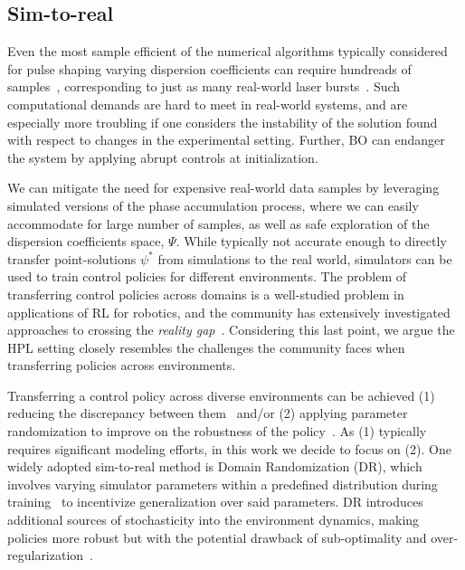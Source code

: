 \subsection{Sim-to-real}
Even the most sample efficient of the numerical algorithms typically considered for pulse shaping varying dispersion coefficients can require hundreads of samples~\citep{capuano2022laser}, corresponding to just as many real-world laser bursts~\citep{shalloo2020automation}. Such computational demands are hard to meet in real-world systems, and are especially more troubling if one considers the instability of the solution found with respect to changes in the experimental setting. Further, BO can endanger the system by applying abrupt controls at initialization.

We can mitigate the need for expensive real-world data samples by leveraging simulated versions of the phase accumulation process, where we can easily accommodate for large number of samples, as well as safe exploration of the dispersion coefficients space, \( \Psi \). While typically not accurate enough to directly transfer point-solutions \( \psi^* \) from simulations to the real world, simulators can be used to train control policies for different environments. The problem of transferring control policies across domains is a well-studied problem in applications of RL for robotics, and the community has extensively investigated approaches to crossing the \emph{reality gap}~\citep{tobin2017domain, valassakis2020crossing}. Considering this last point, we argue the HPL setting closely resembles the challenges the community faces when transferring policies across environments. 

Transferring a control policy across diverse environments can be achieved (1) reducing the discrepancy between them~\citep{zhu2017fast} and/or (2) applying parameter randomization to improve on the robustness of the policy~\citep{peng2018sim}.
As (1) typically requires significant modeling efforts, in this work we decide to focus on (2).
One widely adopted sim-to-real method is Domain Randomization (DR), which involves varying simulator parameters within a predefined distribution during training~\citep{valassakis2020crossing} to incentivize generalization over said parameters. DR introduces additional sources of stochasticity into the environment dynamics, making policies more robust but with the potential drawback of sub-optimality and over-regularization~\citep{margolis2024rapid}.

